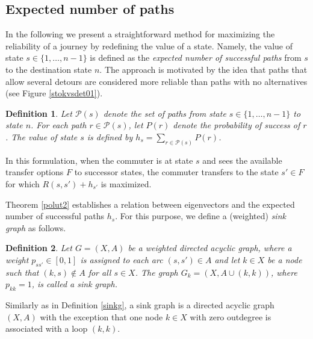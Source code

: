 \documentclass[dissertation,draft*]{aaltoseries}
\newtheorem*{definition}{Definition}
\begin{document}
\subsection{Expected number of paths}
\label{expected}
In the following we present a straightforward method for maximizing the reliability of a journey
by redefining the value of a state. 
Namely, the value of state $s \in \{1,\ldots,n-1\}$ is defined as the \emph{expected number 
of successful paths} from $s$ to the destination state $n$. 
The approach is motivated by the idea that paths that allow several detours are considered
more reliable than paths with no alternatives (see Figure \ref{stokvsdet01}).
\begin{definition}
Let $\mathcal{P}(s)$ denote the set of paths from state $s \in \{1,\ldots,n-1\}$ to state $n$.
For each path $r \in \mathcal{P}(s)$, let $P(r)$ denote the probability of success of $r$.
The value of state $s$ is defined by $h_s = \sum_{r \in \mathcal{P}(s)} P(r)$.
\end{definition} 
In this formulation, when the commuter is at state $s$ and sees the available transfer options $F$ to successor states, 
the commuter transfers to the state $s' \in F$ for which $R(s,s') + h_{s'}$ is maximized.

Theorem \ref{polut2} establishes a relation between eigenvectors and the expected number of successful paths $h_s$.
For this purpose, we define a (weighted) \emph{sink graph} as follows.
\begin{definition}
  Let $G=(X,A)$ be a weighted directed acyclic graph, where a weight $p_{ss'} \in [0,1]$ is assigned to each arc $(s,s') \in A$
and let $k \in X$ be a node such that $(k,s) \notin A$ for all $s \in X$.
The graph $G_k=(X, A \cup (k,k))$, where $p_{kk}=1$, is called a \emph{sink graph}. 
\end{definition}
Similarly as in Definition \ref{sinkg}, a sink graph is a directed acyclic graph $(X,A)$ with the 
exception that one node $k \in X$ with zero outdegree is
associated with a loop $(k,k)$.
\end{document}
